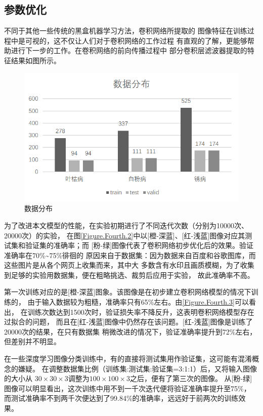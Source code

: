 \setcounter{table}{0}
\setcounter{figure}{0}

\subsection{\hei\xiaosan\textbf{参数优化}}

  不同于其他一些传统的\zs 黑盒机器学习方法，卷积网络\zs 所提取的
  图像特征在\zs 训练过程中是可视的，这不仅让人们对于卷积网络的工作过程
  有直观的了解，更能够帮助进行下一步的工作。在卷积网络的前向传播过程中\zs 
  部分卷积层滤波器提取的特征结果如图所示。

  \begin{figure}[H]
    \centering
    \includegraphics[width=.5\textwidth]{resource/数据分布.bmp}
    \caption{数据分布}
    \label{Figure.Fourth.1}
  \end{figure}

  为了改进本文模型的性能，在实验初期进行了不同迭代次数（分别为10000次、20000次）的实验，
  在图\ref{Figure.Fourth.2}中以[橙-深蓝]、[红-浅蓝]图像对应其测试集和验证集的准确率；而
  [粉-绿]图像代表了卷积网络初步优化后的效果。验证准确率在70\%\textasciitilde75\%徘徊的
  原因来自于数据集：因为数据来自百度和谷歌图库，而这些图片是从各个网页上收集而来，其中大
  多数含有水印且画质模糊，为了收集到足够的实验用数据集，便在粗略挑选、裁剪后应用于实验，
  故此准确率不高。

  第一次训练对应的是[橙-深蓝]图象。该图像是在初步建立卷积网络模型的情况下训练的，
  由于输入数据较为粗糙，准确率只有65\%左右。由\ref{Figure.Fourth.3}可以看出，
  在训练次数达到1500次时，验证损失率不降反升，这表明卷积网络模型存在过拟合的问题，
  而且在[红-浅蓝]图像中仍然存在该问题。[红-浅蓝]图像是训练了20000次的结果，在只有数据集
  稍微改进的情况下，验证准确率提升到72\%左右，但差别并不明显。

  在一些深度学习图像分类训练中，有的直接将测试集用作验证集，这可能有混淆概念的嫌疑。
  在调整数据集比例（训练集:测试集:验证集=3:1:1）后，又将输入图像的大小从
  $30\times30\times3$调整为$100\times100\times3$之后，便有了第三次的图像。
  从[粉-绿]图像可以明显看出，这次训练中用不到一千次迭代便将验证准确率提升至75\%，
  而测试准确率不到两千次便达到了99.84\%的准确率，远远好于前两次的训练效果。


